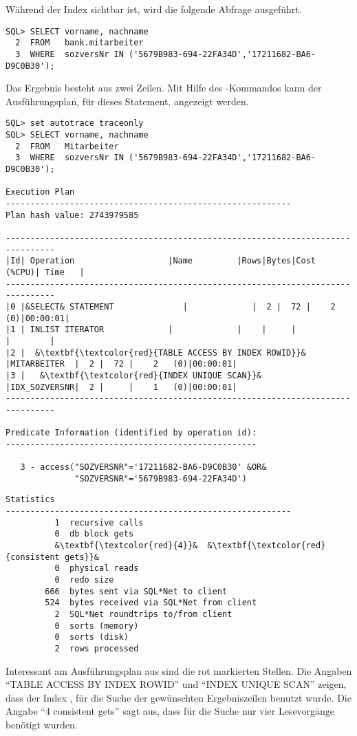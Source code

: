           Während der Index  sichtbar ist, wird die folgende Abfrage ausgeführt.
          \begin{lstlisting}[caption={Abfrage mit sichtbarem Index},label=admin326,language=oracle_sql]
SQL> SELECT vorname, nachname
  2  FROM   bank.mitarbeiter
  3  WHERE  sozversNr IN ('5679B983-694-22FA34D','17211682-BA6-D9C0B30');
          \end{lstlisting}
\clearpage		  
          Das Ergebnis besteht aus zwei Zeilen. Mit Hilfe des -Kommandos kann der Ausführungsplan, für dieses Statement, angezeigt werden.
          \begin{lstlisting}[caption={Ausfürungsplan für die Abfrage mit sichtbarem Index},label=admin327,language=oracle_sql,alsolanguage=sqlplus]
SQL> set autotrace traceonly
SQL> SELECT vorname, nachname
  2  FROM   Mitarbeiter
  3  WHERE  sozversNr IN ('5679B983-694-22FA34D','17211682-BA6-D9C0B30');

Execution Plan
----------------------------------------------------------
Plan hash value: 2743979585

--------------------------------------------------------------------------------
|Id| Operation                   |Name         |Rows|Bytes|Cost (%CPU)| Time   |
--------------------------------------------------------------------------------
|0 |&SELECT& STATEMENT              |             |  2 |  72 |    2   (0)|00:00:01|
|1 | INLIST ITERATOR             |             |    |     |           |        |
|2 |  &\textbf{\textcolor{red}{TABLE ACCESS BY INDEX ROWID}}&     |MITARBEITER  |  2 |  72 |    2   (0)|00:00:01|
|3 |   &\textbf{\textcolor{red}{INDEX UNIQUE SCAN}}&            |IDX_SOZVERSNR|  2 |     |    1   (0)|00:00:01|
--------------------------------------------------------------------------------

Predicate Information (identified by operation id):
---------------------------------------------------

   3 - access("SOZVERSNR"='17211682-BA6-D9C0B30' &OR&
              "SOZVERSNR"='5679B983-694-22FA34D')
          \end{lstlisting}
          \begin{lstlisting}[caption={Und so wird er wieder sichtbar -
          Fortsetzung},language=terminal]
Statistics
----------------------------------------------------------
          1  recursive calls
          0  db block gets
          &\textbf{\textcolor{red}{4}}&  &\textbf{\textcolor{red}{consistent gets}}&
          0  physical reads
          0  redo size
        666  bytes sent via SQL*Net to client
        524  bytes received via SQL*Net from client
          2  SQL*Net roundtrips to/from client
          0  sorts (memory)
          0  sorts (disk)
          2  rows processed
          \end{lstlisting}
          Interessant am Ausführungsplan aus  sind die rot markierten Stellen. Die Angaben \enquote{TABLE ACCESS BY INDEX ROWID} und \enquote{INDEX UNIQUE SCAN} zeigen, dass der Index , für die Suche der gewünschten Ergebniszeilen benutzt wurde. Die Angabe \enquote{4 consistent gets} sagt aus, dass für die Suche nur vier Lesevorgänge benötigt wurden.

